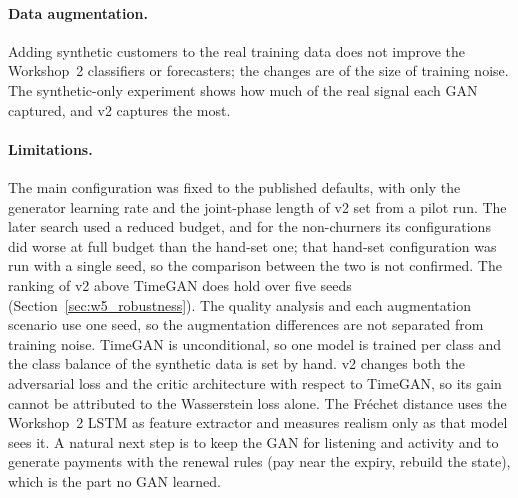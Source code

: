 \documentclass{article}
\begin{document}
\paragraph{Data augmentation.} Adding synthetic customers to the real training data does not improve the Workshop~2 classifiers or forecasters; the changes are of the size of training noise. The synthetic-only experiment shows how much of the real signal each GAN captured, and v2 captures the most.

\paragraph{Limitations.} The main configuration was fixed to the published defaults, with only the generator learning rate and the joint-phase length of v2 set from a pilot run. The later search used a reduced budget, and for the non-churners its configurations did worse at full budget than the hand-set one; that hand-set configuration was run with a single seed, so the comparison between the two is not confirmed. The ranking of v2 above TimeGAN does hold over five seeds (Section~\ref{sec:w5_robustness}). The quality analysis and each augmentation scenario use one seed, so the augmentation differences are not separated from training noise. TimeGAN is unconditional, so one model is trained per class and the class balance of the synthetic data is set by hand. v2 changes both the adversarial loss and the critic architecture with respect to TimeGAN, so its gain cannot be attributed to the Wasserstein loss alone. The Fréchet distance uses the Workshop~2 LSTM as feature extractor and measures realism only as that model sees it. A natural next step is to keep the GAN for listening and activity and to generate payments with the renewal rules (pay near the expiry, rebuild the state), which is the part no GAN learned.
\end{document}
